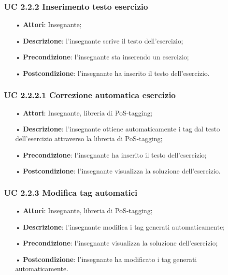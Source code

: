 \subsubsection{UC 2.2.2 Inserimento testo esercizio}

\begin{itemize}
	\item[•] \textbf{Attori}: Insegnante;
	\item[•] \textbf{Descrizione}: l'insegnante scrive il testo dell’esercizio;
	\item[•] \textbf{Precondizione}: l'insegnante sta inserendo un esercizio;
	\item[•] \textbf{Postcondizione}: l'insegnante ha inserito il testo dell'esercizio.
\end{itemize}

\subsubsection{UC 2.2.2.1 Correzione automatica esercizio}
\begin{itemize}
	\item[•] \textbf{Attori}: Insegnante, libreria di PoS-tagging;
	\item[•] \textbf{Descrizione}: l’insegnante ottiene automaticamente i tag dal testo dell’esercizio attraverso la libreria di PoS-tagging;
	\item[•] \textbf{Precondizione}: l'insegnante ha inserito il testo dell'esercizio;
	\item[•] \textbf{Postcondizione}: l'insegnante visualizza la soluzione dell'esercizio.
\end{itemize}

\subsubsection{UC 2.2.3 Modifica tag automatici}
\begin{itemize}
	\item[•] \textbf{Attori}: Insegnante, libreria di PoS-tagging;
	\item[•] \textbf{Descrizione}: l’insegnante modifica i tag generati automaticamente;
	\item[•] \textbf{Precondizione}: l'insegnante visualizza la soluzione dell'esercizio;
	\item[•] \textbf{Postcondizione}: l'insegnante ha modificato i tag generati automaticamente.
\end{itemize}


